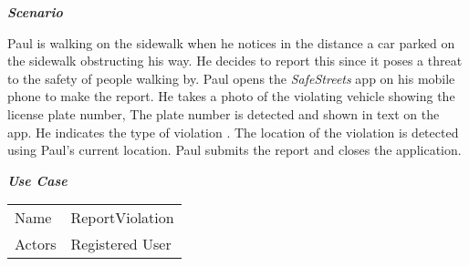 \emph{\textbf{Scenario}}

Paul is walking on the sidewalk when he notices in the distance a car parked on the sidewalk obstructing his way. He decides to report this since it poses a threat to the safety of people walking by. Paul opens the \emph{SafeStreets} app on his mobile phone to make the report. He takes a photo of the violating vehicle showing the license plate number, The plate number is detected and shown in text on the app. He indicates the type of violation . The location of the violation is detected using Paul's current location. Paul submits the report and closes the application.

\emph{\textbf{Use Case}}

\begin{table}[]
\begin{tabular}{ll}
Name            & ReportViolation                                                                                                                                                                                                                                                                                                                                                                                                                                                                                                                                                                                                                                                                                                                                                                                                                                                                                                                                                                                                                                                                                                                        \\
Actors          & Registered User                                                                                                                                                                                                                                                                                                                                                                                                                                                                                                                                                                                                                                                                                                                                                                                                                                                                                                                                                                                                                                                                                                                        \\

\end{tabular}
\end{table}
